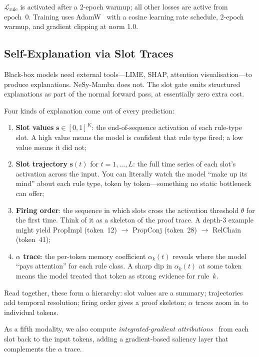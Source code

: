\documentclass[conference]{IEEEtran}
\DeclareRobustCommand{\model}{NeSy-Mamba}
\begin{document}
$\mathcal{L}_\text{rule}$ is activated after a 2-epoch warmup;
all other losses are active from epoch~0. Training uses
AdamW~\cite{loshchilov2019adamw} with a cosine learning rate
schedule, 2-epoch warmup, and gradient clipping at norm 1.0.

\subsection{Self-Explanation via Slot Traces}
\label{sec:selfexplain}

Black-box models need external tools---LIME, SHAP, attention
visualisation---to produce explanations. \model{} does not.
The slot gate emits structured explanations as part of the
normal forward pass, at essentially zero extra cost.

Four kinds of explanation come out of every prediction:
\begin{enumerate}[nosep]
    \item \textbf{Slot values} $\mathbf{s} \in [0,1]^K$:
          the end-of-sequence activation of each rule-type slot.
          A high value means the model is confident that rule type
          fired; a low value means it did not;
    \item \textbf{Slot trajectory} $\mathbf{s}(t)$ for
          $t = 1, \dots, L$: the full time series of each slot's
          activation across the input. You can literally watch
          the model ``make up its mind'' about each rule type,
          token by token---something no static bottleneck can offer;
    \item \textbf{Firing order}: the sequence in which slots
          cross the activation threshold $\theta$ for the first
          time. Think of it as a skeleton of the proof trace.
          A depth-3 example might yield PropImpl (token~12)
          $\to$ PropConj (token~28) $\to$ RelChain (token~41);
    \item \textbf{$\alpha$ trace}: the per-token memory
          coefficient $\alpha_k(t)$ reveals where the model
          ``pays attention'' for each rule class. A sharp dip in
          $\alpha_k(t)$ at some token means the model treated that
          token as strong evidence for rule~$k$.
\end{enumerate}

Read together, these form a hierarchy: slot values are a summary;
trajectories add temporal resolution; firing order gives a proof
skeleton; $\alpha$ traces zoom in to individual tokens.

As a fifth modality, we also compute \emph{integrated-gradient
attributions}~\cite{sundararajan2017ig} from each slot back to
the input tokens, adding a gradient-based saliency layer that
complements the $\alpha$ trace.
\end{document}
